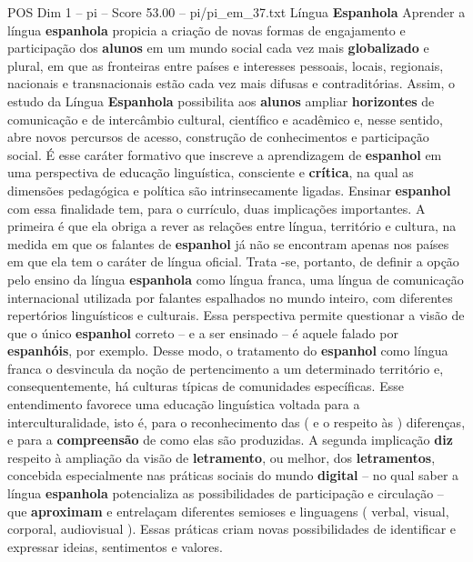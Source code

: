\begin{textsample}{POS Dim 1 – pi – Score 53.00 – pi/pi\_em\_37.txt}  \label{ex:f1_pos_059}
Língua \textbf{Espanhola} Aprender a língua \textbf{espanhola} propicia a criação de novas formas de engajamento e participação dos \textbf{alunos} em um mundo social cada vez mais \textbf{globalizado} e plural, em que as fronteiras entre países e interesses pessoais, locais, regionais, nacionais e transnacionais estão cada vez mais difusas e contraditórias.
Assim, o estudo da Língua \textbf{Espanhola} possibilita aos \textbf{alunos} ampliar \textbf{horizontes} de comunicação e de intercâmbio cultural, científico e acadêmico e, nesse sentido, abre novos percursos de acesso, construção de conhecimentos e participação social.
É esse caráter formativo que inscreve a aprendizagem de \textbf{espanhol} em uma perspectiva de educação linguística, consciente e \textbf{crítica}, na qual as dimensões pedagógica e política são intrinsecamente ligadas.
Ensinar \textbf{espanhol} com essa finalidade tem, para o currículo, duas implicações importantes.
A primeira é que ela obriga a rever as relações entre língua, território e cultura, na medida em que os falantes de \textbf{espanhol} já não se encontram apenas nos países em que ela tem o caráter de língua oficial.
Trata -se, portanto, de definir a opção pelo ensino da língua \textbf{espanhola} como língua franca, uma língua de comunicação internacional utilizada por falantes espalhados no mundo inteiro, com diferentes repertórios linguísticos e culturais.
Essa perspectiva permite questionar a visão de que o único \textbf{espanhol} correto – e a ser ensinado – é aquele falado por \textbf{espanhóis}, por exemplo.
Desse modo, o tratamento do \textbf{espanhol} como língua franca o desvincula da noção de pertencimento a um determinado território e, consequentemente, há culturas típicas de comunidades específicas.
Esse entendimento favorece uma educação linguística voltada para a interculturalidade, isto é, para o reconhecimento das ( e o respeito às ) diferenças, e para a \textbf{compreensão} de como elas são produzidas.
A segunda implicação \textbf{diz} respeito à ampliação da visão de \textbf{letramento}, ou melhor, dos \textbf{letramentos}, concebida especialmente nas práticas sociais do mundo \textbf{digital} – no qual saber a língua \textbf{espanhola} potencializa as possibilidades de participação e circulação – que \textbf{aproximam} e entrelaçam diferentes semioses e linguagens ( verbal, visual, corporal, audiovisual ).
Essas práticas criam novas possibilidades de identificar e expressar ideias, sentimentos e valores.

\end{textsample}
